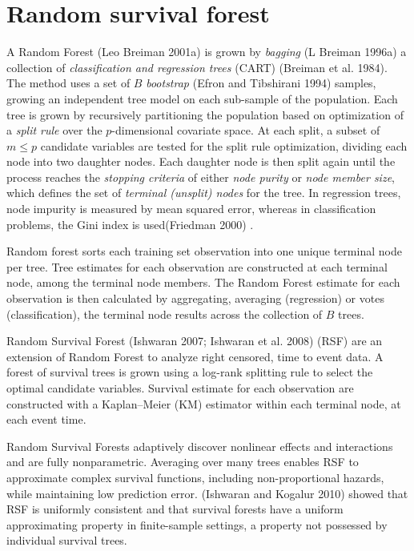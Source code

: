 \documentclass[article]{jss}
\begin{document}
\section{Random survival forest}\label{random-survival-forest}

A Random Forest (Leo Breiman 2001a) is grown by \emph{bagging} (L
Breiman 1996a) a collection of
\emph{classification and regression trees} (CART) (Breiman et al. 1984).
The method uses a set of \(B\) \emph{bootstrap} (Efron and Tibshirani
1994) samples, growing an independent tree model on each sub-sample of
the population. Each tree is grown by recursively partitioning the
population based on optimization of a \emph{split rule} over the
\(p\)-dimensional covariate space. At each split, a subset of
\(m \le p\) candidate variables are tested for the split rule
optimization, dividing each node into two daughter nodes. Each daughter
node is then split again until the process reaches the
\emph{stopping criteria} of either \emph{node purity} or
\emph{node member size}, which defines the set of
\emph{terminal (unsplit) nodes} for the tree. In regression trees, node
impurity is measured by mean squared error, whereas in classification
problems, the Gini index is used(Friedman 2000) .

Random forest sorts each training set observation into one unique
terminal node per tree. Tree estimates for each observation are
constructed at each terminal node, among the terminal node members. The
Random Forest estimate for each observation is then calculated by
aggregating, averaging (regression) or votes (classification), the
terminal node results across the collection of \(B\) trees.

Random Survival Forest (Ishwaran 2007; Ishwaran et al. 2008) (RSF) are
an extension of Random Forest to analyze right censored, time to event
data. A forest of survival trees is grown using a log-rank splitting
rule to select the optimal candidate variables. Survival estimate for
each observation are constructed with a Kaplan--Meier (KM) estimator
within each terminal node, at each event time.

Random Survival Forests adaptively discover nonlinear effects and
interactions and are fully nonparametric. Averaging over many trees
enables RSF to approximate complex survival functions, including
non-proportional hazards, while maintaining low prediction error.
(Ishwaran and Kogalur 2010) showed that RSF is uniformly consistent and
that survival forests have a uniform approximating property in
finite-sample settings, a property not possessed by individual survival
trees.
\end{document}
